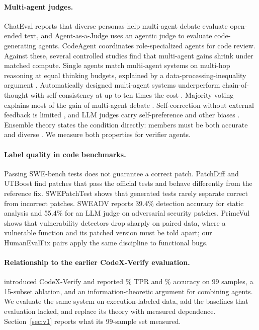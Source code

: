 \paragraph{Multi-agent judges.}
ChatEval \citep{chan2023chateval} reports that diverse personas help multi-agent debate evaluate open-ended text, and Agent-as-a-Judge \citep{zhuge2024agentasjudge} uses an agentic judge to evaluate code-generating agents. CodeAgent \citep{tang2024codeagent} coordinates role-specialized agents for code review. Against these, several controlled studies find that multi-agent gains shrink under matched compute. Single agents match multi-agent systems on multi-hop reasoning at equal thinking budgets, explained by a data-processing-inequality argument \citep{trankiela2026}. Automatically designed multi-agent systems underperform chain-of-thought with self-consistency at up to ten times the cost \citep{jwalapuram2026illusion}. Majority voting explains most of the gain of multi-agent debate \citep{choi2025debate}. Self-correction without external feedback is limited \citep{huang2024selfcorrect,kamoi2024selfcorrect,stechly2024selfverify}, and LLM judges carry self-preference and other biases \citep{wataoka2024selfpref,ye2024justice}. Ensemble theory states the condition directly: members must be both accurate and diverse \citep{dietterich2000ensemble,kuncheva2003diversity}. We measure both properties for verifier agents.

\paragraph{Label quality in code benchmarks.}
Passing SWE-bench tests does not guarantee a correct patch. PatchDiff \citep{patchdiff2025} and UTBoost \citep{utboost2025} find patches that pass the official tests and behave differently from the reference fix. SWEPatchTest \citep{swepatchtest2026} shows that generated tests rarely separate correct from incorrect patches. SWEADV \citep{sweadv2026} reports 39.4\% detection accuracy for static analysis and 55.4\% for an LLM judge on adversarial security patches. PrimeVul \citep{primevul2024} shows that vulnerability detectors drop sharply on paired data, where a vulnerable function and its patched version must be told apart; our HumanEvalFix pairs apply the same discipline to functional bugs.

\paragraph{Relationship to the earlier CodeX-Verify evaluation.}
\citet{rajan2025codexverify} introduced CodeX-Verify and reported \nOldCvTpr\% TPR and \nOldCvAcc\% accuracy on 99 samples, a 15-subset ablation, and an information-theoretic argument for combining agents. We evaluate the same system on execution-labeled data, add the baselines that evaluation lacked, and replace its theory with measured dependence. Section~\ref{sec:v1} reports what its 99-sample set measured.

